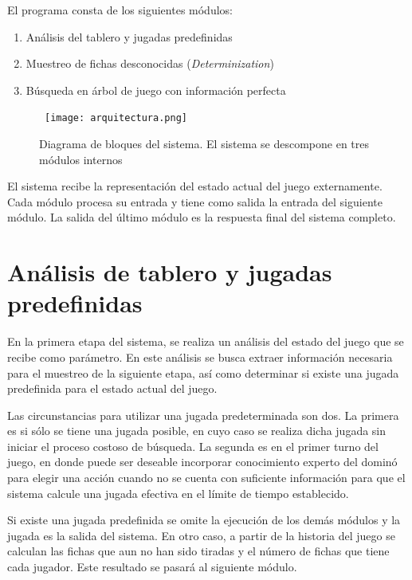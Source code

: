 El programa consta de los siguientes módulos:

\begin{enumerate}
   \item Análisis del tablero y jugadas predefinidas
   \item Muestreo de fichas desconocidas (\textit{Determinization})
   \item Búsqueda en árbol de juego con información perfecta
\end{enumerate}


\begin{figure}[ht]
   \begin{center}
      \hbox{\hspace{-5em} \texttt{[image: arquitectura.png]}}
      \caption{Diagrama de bloques del sistema. El sistema se descompone en tres módulos internos}
      \label{ARQ}
   \end{center}
\end{figure}
El sistema recibe la representación del estado actual del juego externamente.
Cada módulo procesa su entrada y tiene como salida la entrada del siguiente
módulo. La salida del último módulo es la respuesta final del sistema completo.

\section{Análisis de tablero y jugadas predefinidas}

En la primera etapa del sistema, se realiza un análisis del estado del juego que
se recibe como parámetro. En este análisis se busca extraer información
necesaria para el muestreo de la siguiente etapa, así como determinar si existe
una jugada predefinida para el estado actual del juego.

Las circunstancias para utilizar una jugada predeterminada son dos. La primera
es si sólo se tiene una jugada posible, en cuyo caso se realiza dicha jugada sin
iniciar el proceso costoso de búsqueda. La segunda es en el primer turno del
juego, en donde puede ser deseable incorporar conocimiento experto del dominó
para elegir una acción cuando no se cuenta con suficiente información para que
el sistema calcule una jugada efectiva en el límite de tiempo establecido.

Si existe una jugada predefinida se omite la ejecución de los demás módulos y la
jugada es la salida del sistema. En otro caso, a partir de la historia del juego
se calculan las fichas que aun no han sido tiradas y el número de fichas que
tiene cada jugador. Este resultado se pasará al siguiente módulo.

